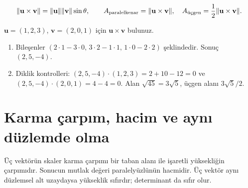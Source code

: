 {\small\[
\|\mathbf u\times\mathbf v\|=\|\mathbf u\|\|\mathbf v\|\sin\theta,\qquad A_{\rm paralelkenar}=\|\mathbf u\times\mathbf v\|,\quad A_{\text{üçgen}}=\frac12\|\mathbf u\times\mathbf v\|.
\]}
\begin{tcolorbox}[title={Örnek 1.4 | Tahtadaki vektörel çarpım},colframe=accent]\(\mathbf u=(1,2,3)\), \(\mathbf v=(2,0,1)\) için \(\mathbf u\times\mathbf v\) bulunuz.
\par{}\end{tcolorbox}
\begin{tcolorbox}[title={Adım adım çözüm},colback=green!3!white,colframe=green]\begin{enumerate}
\item Bileşenler \((2\cdot1-3\cdot0,\,3\cdot2-1\cdot1,\,1\cdot0-2\cdot2)\) şeklindedir. Sonuç \((2,5,-4)\).
\item Diklik kontrolleri: \((2,5,-4)\cdot(1,2,3)=2+10-12=0\) ve \((2,5,-4)\cdot(2,0,1)=4-4=0\). Alan \(\sqrt{45}=3\sqrt5\), üçgen alanı \(3\sqrt5/2\).
\end{enumerate}\end{tcolorbox}
\section{Karma çarpım, hacim ve aynı düzlemde olma}
Üç vektörün skaler karma çarpımı bir taban alanı ile işaretli yüksekliğin çarpımıdır. Sonucun mutlak değeri paralelyüzlünün hacmidir. Üç vektör aynı düzlemsel alt uzaydaysa yükseklik sıfırdır; determinant da sıfır olur.


